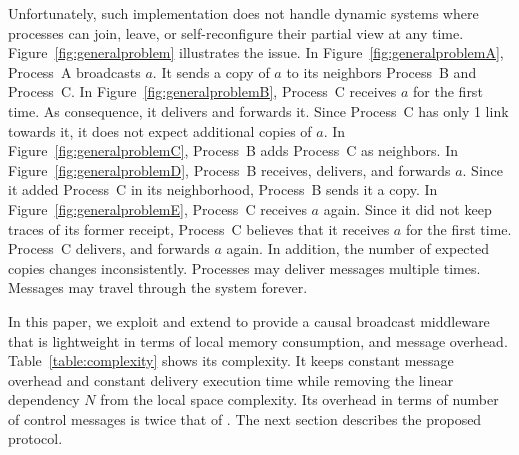 Unfortunately, such implementation does not handle dynamic systems where
processes can join, leave, or self-reconfigure their partial view at any
time. Figure~\ref{fig:generalproblem} illustrates the issue. In
Figure~\ref{fig:generalproblemA}, Process~A broadcasts $a$. It sends a copy of
$a$ to its neighbors Process~B and Process~C. In
Figure~\ref{fig:generalproblemB}, Process~C receives $a$ for the first time.  As
consequence, it delivers and forwards it. Since Process~C has only 1 link
towards it, it does not expect additional copies of $a$. In
Figure~\ref{fig:generalproblemC}, Process~B adds Process~C as neighbors. In
Figure~\ref{fig:generalproblemD}, Process~B receives, delivers, and forwards
$a$. Since it added Process~C in its neighborhood, Process~B sends it a copy.
In Figure~\ref{fig:generalproblemE}, Process~C receives $a$ again. Since it did
not keep traces of its former receipt, Process~C believes that it receives $a$
for the first time. Process~C delivers, and forwards $a$ again. In addition, the
number of expected copies changes inconsistently. Processes may deliver messages
multiple times. Messages may travel through the system forever.



In this paper, we exploit and extend \PCBROADCAST to provide a causal broadcast
middleware that is lightweight in terms of local memory consumption, and message
overhead. Table~\ref{table:complexity} shows its complexity. It keeps constant
message overhead and constant delivery execution time while removing the linear
dependency $N$ from the local space complexity. Its overhead in terms of number
of control messages is twice that of \PCBROADCAST.
The next section describes the proposed protocol.

